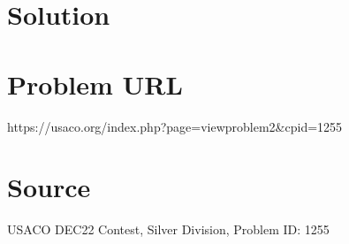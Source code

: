 \documentclass[12pt]{article}
\begin{document}
\section*{Solution}


\section*{Problem URL}
https://usaco.org/index.php?page=viewproblem2&cpid=1255

\section*{Source}
USACO DEC22 Contest, Silver Division, Problem ID: 1255
\end{document}
